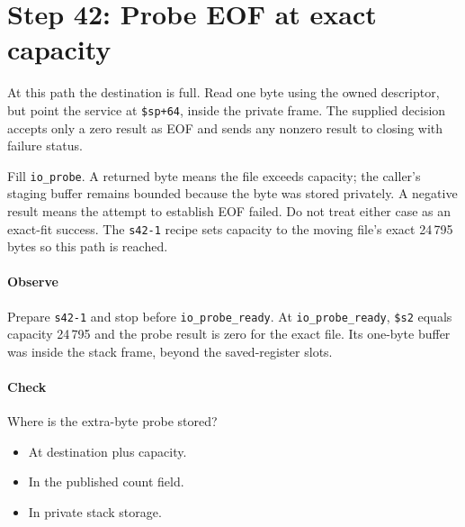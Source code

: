 \section{Step 42: Probe EOF at exact capacity}
At this path the destination is full. Read one byte using the owned
descriptor, but point the service at \texttt{\$sp+64}, inside the private
frame. The supplied decision accepts only a zero result as EOF and sends any
nonzero result to closing with failure status.

Fill \texttt{io\_probe}. A returned byte means the file exceeds capacity;
the caller's staging buffer remains bounded because the byte was stored privately.
A negative result means the attempt to establish EOF failed. Do not treat either
case as an exact-fit success. The \texttt{s42-1} recipe sets capacity to the
moving file's exact 24\,795 bytes so this path is reached.

\paragraph{Observe} Prepare \texttt{s42-1} and stop before
\texttt{io\_probe\_ready}. At \texttt{io\_probe\_ready}, \texttt{\$s2} equals capacity
24\,795 and the probe result is zero for the exact file. Its one-byte buffer
was inside the stack frame, beyond the saved-register slots.

\paragraph{Check} Where is the extra-byte probe stored?
\begin{itemize}
\item[A.] At destination plus capacity.
\item[B.] In the published count field.
\item[C.] In private stack storage.
\end{itemize}
